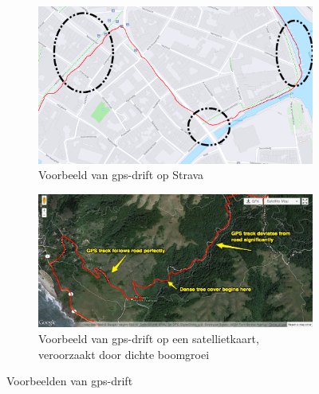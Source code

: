 \begin{figure}[h]
    \centering
    \begin{subfigure}[b]{.45\textwidth}
        \centering
        \includegraphics[width=\textwidth]{fig/Afwijkingen&Analyses/Crooked Routes/GPS-drift.png}
        \caption{Voorbeeld van gps-drift op Strava}\label{fig:gps_drift_Strava}
    \end{subfigure}\hfill
    \begin{subfigure}[b]{.49\textwidth}
        \centering
        \includegraphics[width=\textwidth]{fig/Afwijkingen&Analyses/Crooked Routes/GPS-Drift_onlnie.jpg}
        \caption{Voorbeeld van gps-drift op een satellietkaart, veroorzaakt door dichte boomgroei~\cite{BadGPSDa19:online}}
    \end{subfigure}
    \caption{Voorbeelden van gps-drift}\label{fig:gps_drift}
\end{figure}


